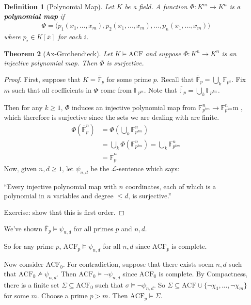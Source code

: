 \documentclass[]{article}
\theoremstyle{custhm}
\newtheorem{theorem}{Theorem}[section]
\theoremstyle{cusdef}
\newtheorem{defin}[theorem]{Definition}
\theoremstyle{custhm}
\theoremstyle{custhm}
\theoremstyle{custhm}
\theoremstyle{ex}
\theoremstyle{custhm}
\theoremstyle{cusdef}
\theoremstyle{remark}
\theoremstyle{remark}
\theoremstyle{numremark}
\newcommand{\ra}{\rightarrow}
\newcommand{\undf}[1]{\textit{\textbf{#1}}}
\renewcommand{\L}{\mathcal{L}}
\renewcommand{\bar}{\overline}
\newcommand{\acf}{\textrm{ACF}}
\newcommand{\F}{\mathbb{F}}
\renewcommand{\subset}{\subseteq}
\begin{document}
\begin{defin}[Polynomial Map]
Let $K$ be a field. A function $\Phi: K^m\ra K^n$ is a \undf{polynomial map} if
\begin{align*}
\Phi = \big(p_1(x_1,\dots,x_m),p_2(x_1,\dots,x_m),\dots,p_n(x_1,\dots,x_m)\big)
\end{align*}
where $p_i \in K[\bar{x}]$ for each $i$.
\end{defin}
\begin{theorem}[Ax-Grothendieck]
Let $K\models \acf$ and suppose $\Phi:K^n\ra K^n$ is an injective polynomial map. Then $\Phi$ is surjective.
\end{theorem}
\begin{proof}
First, suppose that $K = \bar{\mathbb{F}}_p$ for some prime $p$. Recall that $\bar{\mathbb{F}}_p = \bigcup_k \mathbb{F}_{p^k}$. Fix $m$ such that all coefficients in $\Phi$ come from $\mathbb{F}_{p^m}$. Note that $\bar{\mathbb{F}}_p = \bigcup_k \mathbb{F}_{p^{km}}$.

Then for any $k\ge 1$, $\Phi$ induces an injective polynomial map from $\mathbb{F}_{p^{km}}^n \ra \mathbb{F}_{p^{km}}^n$m , which therefore is surjective since the sets we are dealing with are finite.
\begin{align*}
\Phi\left(\bar{\mathbb{F}}_p^n\right) &= \Phi\left(\bigcup_k\mathbb{F}_{p^{km}}^n\right)\\
&= \bigcup_k\Phi\left(\mathbb{F}_{p^{km}}^n\right) = \bigcup_k\mathbb{F}_{p^{km}}^n\\
&=\bar{\mathbb{F}}_p^n
\end{align*}
Now, given $n,d\ge 1$, let $\psi_{n,d}$ be the $\L$-sentence which says:

``Every injective polynomial map with $n$ coordinates, each of which is a polynomial in $n$ variables and degree $\le d$, is surjective.''

Exercise: show that this is first order.
\end{proof}

We've shown $\bar{\F}_p \models \psi_{n,d}$ for all primes $p$ and $n,d$.

So for any prime $p$, $\acf_p\models\psi_{n,d}$ for all $n,d$ since $\acf_p$ is complete.

Now consider $\acf_0$. For contradiction, suppose that there exists soem $n,d$ such that $\acf_0\not\models\psi_{n,d}$. Then $\acf_0\models\neg\psi_{n,d}$ since $\acf_0$ is complete. By Compactness, there is a finite set $\Sigma\subset \acf_0$ such that $\sigma \models \neg \psi_{n,d}$. So $\Sigma\subset \acf\cup\{\neg\chi_1,\dots,\neg\chi_m\}$ for some $m$. Choose a prime $p > m$. Then $\acf_p\models \Sigma$.
\end{document}
